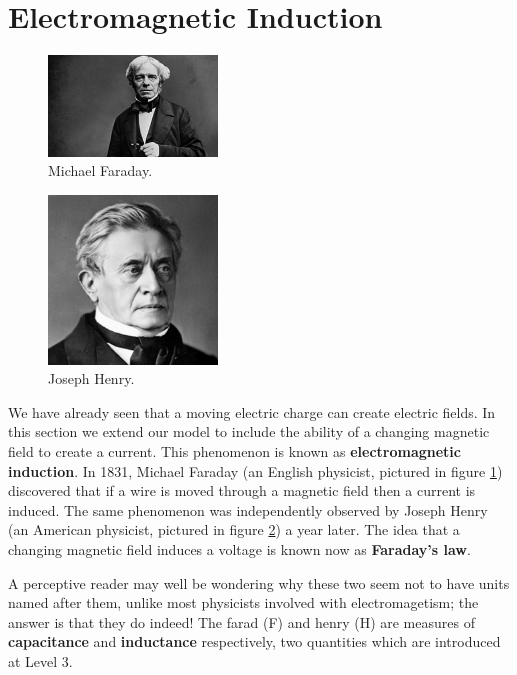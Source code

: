 \documentclass[a4paper]{amsbook}
\newcommand\capcite[1]{}
\begin{document}
\section{Electromagnetic Induction}
\begin{figure}
  \centering
  \includegraphics[width=0.4\textwidth]{faraday}
  \caption{Michael Faraday. \capcite{https://i.guim.co.uk/img/media/abffc68f38357082e669f2227a6310740d982f25/0_214_2710_1626/master/2710.jpg?w=300&q=55&auto=format&usm=12&fit=max&s=372d1fa6db5ba26038918cdceef47dc1}\label{fig:faraday}}
\end{figure}
\begin{figure}
  \centering
  \includegraphics[width=0.4\textwidth]{henry}
  \caption{Joseph Henry. \capcite{https://www.biography.com/.image/t_share/MTE4MDAzNDEwNTUyMDYzNTAy/joseph-henry-9335457-1-402.jpg}\label{fig:henry}}
\end{figure}
We have already seen that a moving electric charge can create electric fields. In this section we extend our model to include
the ability of a changing magnetic field to create a current. This phenomenon is known as \textbf{electromagnetic induction}.
In 1831, Michael Faraday (an English physicist, pictured in figure \ref{fig:faraday}) discovered that if a wire is moved through
a magnetic field then a current is induced. The same phenomenon was independently observed by Joseph Henry (an American physicist,
pictured in figure \ref{fig:henry}) a year later. The idea that a changing magnetic field induces a voltage is known now as \textbf{Faraday's law}.

A perceptive reader may well be wondering why these two seem not to have units named after them, unlike most physicists involved
with electromagetism; the answer is that they do indeed! The farad (F) and henry (H) are measures of \textbf{capacitance}
and \textbf{inductance} respectively, two quantities which are introduced at Level 3.
\end{document}
